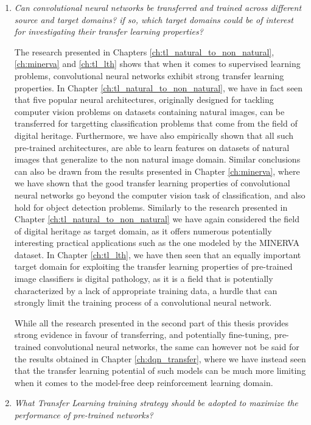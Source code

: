 \begin{enumerate}
	\item \textit{Can convolutional neural networks be transferred and trained across different source and target domains? if so, which target domains could be of interest for investigating their transfer learning properties?}
	
	The research presented in Chapters \ref{ch:tl_natural_to_non_natural}, \ref{ch:minerva} and \ref{ch:tl_lth} shows that when it comes to supervised learning problems, convolutional neural networks exhibit strong transfer learning properties. In Chapter \ref{ch:tl_natural_to_non_natural}, we have in fact seen that five popular neural architectures, originally designed for tackling computer vision problems on datasets containing natural images, can be transferred for targetting classification problems that come from the field of digital heritage. Furthermore, we have also empirically shown that all such pre-trained architectures, are able to learn features on datasets of natural images that generalize to the non natural image domain. Similar conclusions can also be drawn from the results presented in Chapter \ref{ch:minerva}, where we have shown that the good transfer learning properties of convolutional neural networks go beyond the computer vision task of classification, and also hold for object detection problems. Similarly to the research presented in Chapter \ref{ch:tl_natural_to_non_natural} we have again considered the field of digital heritage as target domain, as it offers numerous potentially interesting practical applications such as the one modeled by the MINERVA dataset. In Chapter \ref{ch:tl_lth}, we have then seen that an equally important target domain for exploiting the transfer learning properties of pre-trained image classifiers is digital pathology, as it is a field that is potentially characterized by a lack of appropriate training data, a hurdle that can strongly limit the training process of a convolutional neural network.

	While all the research presented in the second part of this thesis provides strong evidence in favour of transferring, and potentially fine-tuning, pre-trained convolutional neural networks, the same can however not be said for the results obtained in Chapter \ref{ch:dqn_transfer}, where we have instead seen that the transfer learning potential of such models can be much more limiting when it comes to the model-free deep reinforcement learning domain. 

	
	\item \textit{What Transfer Learning training strategy should be adopted to maximize the performance of pre-trained networks?}


\end{enumerate}
